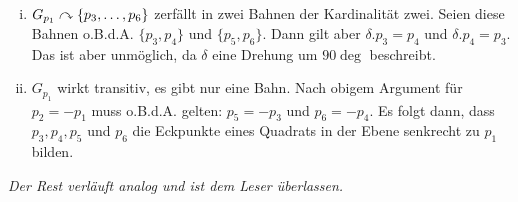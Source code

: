 \begin{beweis}
\begin{enumerate}
\begin{enumerate}[(I)]
\begin{enumerate}[(a)]
\begin{enumerate}[(i)]
\item $G_{p_1} \curvearrowright \{p_3, \dots, p_6\}$ zerfällt in zwei Bahnen der Kardinalität zwei. Seien diese Bahnen o.B.d.A. $\{p_3,p_4\}$ und $\{p_5,p_6\}$. Dann gilt aber $\delta.p_3 = p_4$ und $\delta.p_4 = p_3$. Das ist aber unmöglich, da $\delta$ eine Drehung um $90 \deg$ beschreibt.
\item $G_{p_1}$ wirkt transitiv, es gibt nur eine Bahn. Nach obigem Argument für $p_2 = -p_1$ muss o.B.d.A. gelten: $p_5 = -p_3$ und $p_6=-p_4$. Es folgt dann, dass $p_3,p_4,p_5$ und $p_6$ die Eckpunkte eines Quadrats in der Ebene senkrecht zu $p_1$ bilden.
\end{enumerate} 
\end{enumerate}
\end{enumerate}
\end{enumerate}
\textit{Der Rest verläuft analog und ist dem Leser überlassen.}
\end{beweis}
